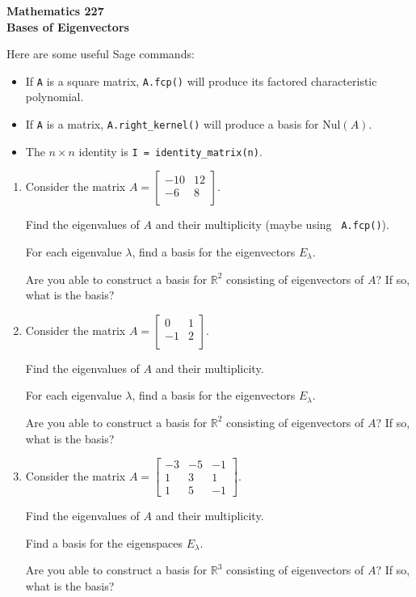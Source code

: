 \documentclass[12pt]{article}
\newcommand{\vs}[1]{\vspace{#1in}}
\newcommand{\real}{{\mathbb R}}
\newcommand{\nul}{\text{Nul}}
\begin{document}
\noindent
{\bf Mathematics 227} \\ 
{\bf Bases of Eigenvectors}

\bigskip
Here are some useful Sage commands:
\begin{itemize}
\item If {\tt A} is a square matrix, {\tt A.fcp()} will produce its
  factored characteristic polynomial.
\item If {\tt A} is a matrix, {\tt A.right\_kernel()} will produce a
  basis for $\nul(A)$.
\item The $n\times n$ identity is {\tt I = identity\_matrix(n)}.
\end{itemize}

\begin{enumerate}
\item Consider the matrix
  $A=
  \left[
    \begin{array}{cc}
      -10 & 12 \\
      -6 & 8 \\
    \end{array}
  \right].
  $

  Find the eigenvalues of $A$ and their multiplicity (maybe using {\tt
    A.fcp()}).

  \vs{1}
  For each eigenvalue $\lambda$, find a basis for the eigenvectors
  $E_\lambda$.

  \vs{1.5}
  Are you able to construct a basis for $\real^2$ consisting of
  eigenvectors of $A$?  If so, what is the basis?  

  \vs{1}

\item Consider the matrix
  $A=
  \left[
    \begin{array}{cc}
      0 & 1 \\
      -1 & 2 \\
    \end{array}
  \right].
  $

  Find the eigenvalues of $A$ and their multiplicity.

  \vs{1}
  \newpage
  For each eigenvalue $\lambda$, find a basis for the eigenvectors
  $E_\lambda$.

  \vs{1.5}
  Are you able to construct a basis for $\real^2$ consisting of
  eigenvectors of $A$?  If so, what is the basis?

  \vs{1}
\item Consider the matrix
  $A=
  \left[
    \begin{array}{rrr}
      -3 & -5 & -1 \\
      1 & 3 & 1 \\
      1 & 5 & -1
    \end{array}
  \right]
  $.

  Find the eigenvalues of $A$ and their multiplicity.

  \vs{1}
  Find a basis for the eigenspaces $E_\lambda$.

  \vs{2}
  Are you able to construct a basis for $\real^3$ consisting of
  eigenvectors of $A$?  If so, what is the basis?

  \vs{1}
  

\end{enumerate}
\end{document}
